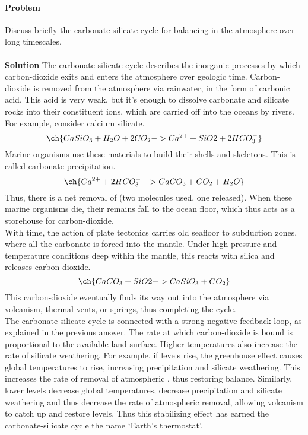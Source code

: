 \documentclass[10pt]{article}
\newcounter{prob}
\def\problem{\stepcounter{prob}\paragraph{Problem \arabic{prob}}}
\def\solution{\\\\\textbf{Solution }}
\begin{document}
        \problem Discuss briefly the carbonate-silicate cycle for balancing  in the atmosphere over long timescales.
        \solution The carbonate-silicate cycle describes the inorganic processes by which carbon-dioxide exits and enters the atmosphere over
        geologic time. Carbon-dioxide is removed from the atmosphere via rainwater, in the form of carbonic acid. This acid is very weak,
        but it's enough to dissolve carbonate and silicate rocks into their constituent ions, which are carried off into the oceans
        by rivers. For example, consider calcium silicate.
        \[
        \ch{CaSiO_3 + H_2O + 2 CO_2 -> Ca^{2+} + SiO2 + 2 HCO_3^-}
        \]
        Marine organisms use these materials to build their shells and skeletons. This is called carbonate precipitation.
        \[
        \ch{Ca^{2+} + 2 HCO_3^- -> CaCO_3 + CO_2 + H_2O}
        \]
        Thus, there is a net removal of  (two molecules used, one released). When these marine organisms die, their remains
        fall to the ocean floor, which thus acts as a storehouse for carbon-dioxide. \\

        With time, the action of plate tectonics carries old seafloor to subduction zones, where all the carbonate is forced into the mantle.
        Under high pressure and temperature conditions deep within the mantle, this reacts with silica and releases carbon-dioxide.
        \[
        \ch{CaCO_3 + SiO2 -> CaSiO_3 + CO_2}
        \]
        This carbon-dioxide eventually finds its way out into the atmosphere via volcanism, thermal vents, or springs, thus completing the cycle. \\

        The carbonate-silicate cycle is connected with a strong negative feedback loop, as explained in the previous answer. The rate at which
        carbon-dioxide is bound is proportional to the available land surface. Higher temperatures also increase the rate of silicate weathering.
        For example, if  levels rise, the greenhouse effect causes global temperatures to rise, increasing precipitation and silicate weathering.
        This increases the rate of removal of atmospheric , thus restoring balance.
        Similarly, lower  levels decrease global temperatures, decrease precipitation and silicate weathering and thus
        decrease the rate of atmospheric  removal, allowing volcanism to catch up and restore  levels.
        Thus this stabilizing effect has earned the carbonate-silicate cycle the name `Earth's thermostat'.
\end{document}

